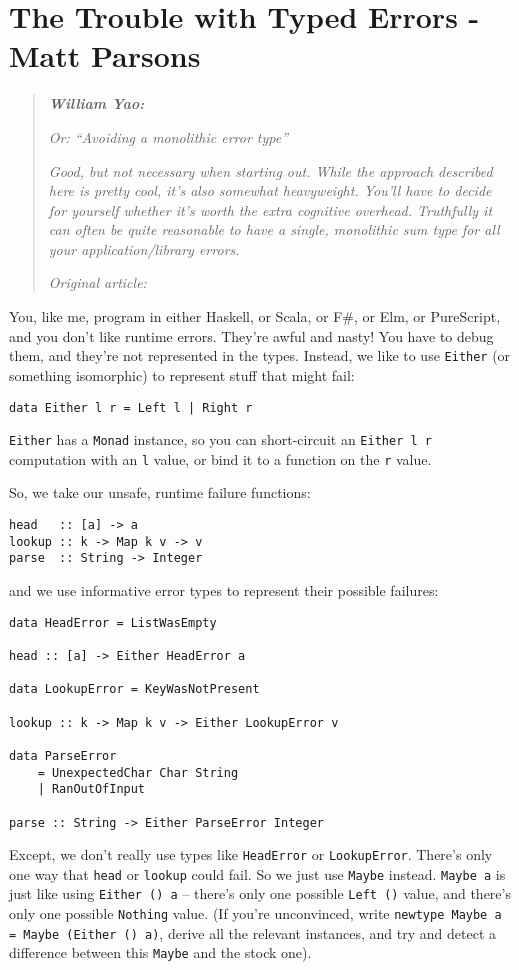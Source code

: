 \chapter{The Trouble with Typed Errors - Matt Parsons}

\begin{quotation}
\noindent\textit{\textbf{William Yao:}}

\textit{Or: ``Avoiding a monolithic error type''}

\textit{Good, but not necessary when starting out. While the approach described here is pretty cool, it's also somewhat heavyweight. You'll have to decide for yourself whether it's worth the extra cognitive overhead. Truthfully it can often be quite reasonable to have a single, monolithic sum type for all your application/library errors.}

\vspace{\baselineskip}
\noindent\textit{Original article: \cite{the_trouble_with_typed_errors}}
\end{quotation}

You, like me, program in either Haskell, or Scala, or F\#, or Elm, or PureScript, and you don't like runtime errors. They're awful and nasty! You have to debug them, and they're not represented in the types. Instead, we like to use \texttt{Either} (or something isomorphic) to represent stuff that might fail:

\begin{verbatim}
data Either l r = Left l | Right r
\end{verbatim}
\texttt{Either} has a \texttt{Monad} instance, so you can short-circuit an \texttt{Either l r} computation with an \texttt{l} value, or bind it to a function on the \texttt{r} value.

So, we take our unsafe, runtime failure functions:

\begin{verbatim}
head   :: [a] -> a
lookup :: k -> Map k v -> v
parse  :: String -> Integer
\end{verbatim}
and we use informative error types to represent their possible failures:

\begin{verbatim}
data HeadError = ListWasEmpty

head :: [a] -> Either HeadError a

data LookupError = KeyWasNotPresent

lookup :: k -> Map k v -> Either LookupError v

data ParseError
    = UnexpectedChar Char String
    | RanOutOfInput

parse :: String -> Either ParseError Integer
\end{verbatim}
Except, we don't really use types like \texttt{HeadError} or \texttt{LookupError}. There's only one way that \texttt{head} or \texttt{lookup} could fail. So we just use \texttt{Maybe} instead. \texttt{Maybe a} is just like using \texttt{Either () a} -- there's only one possible \texttt{Left ()} value, and there's only one possible \texttt{Nothing} value. (If you're unconvinced, write \texttt{newtype Maybe a = Maybe (Either () a)}, derive all the relevant instances, and try and detect a difference between this \texttt{Maybe} and the stock one).

